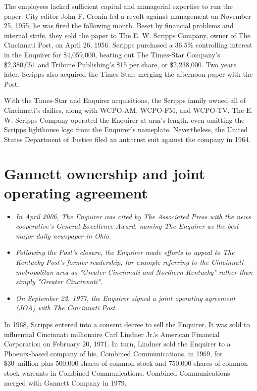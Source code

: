 The employees lacked sufficient capital and managerial expertise to run
the paper. City editor John F. Cronin led a revolt against management on
November 25, 1955; he was fired the following month. Beset by financial
problems and internal strife, they sold the paper to The E. W. Scripps
Company, owner of The Cincinnati Post, on April 26, 1956. Scripps
purchased a 36.5\% controlling interest in the Enquirer for \$4,059,000,
beating out The Times-Star Company's \$2,380,051 and Tribune
Publishing's \$15 per share, or \$2,238,000. Two years later, Scripps
also acquired the Times-Star, merging the afternoon paper with the Post.

With the Times-Star and Enquirer acquisitions, the Scripps family owned
all of Cincinnati's dailies, along with WCPO-AM, WCPO-FM, and WCPO-TV.
The E. W. Scripps Company operated the Enquirer at arm's length, even
omitting the Scripps lighthouse logo from the Enquirer's nameplate.
Nevertheless, the United States Department of Justice filed an antitrust
suit against the company in 1964.

\section{Gannett ownership and joint operating
agreement}\label{gannett-ownership-and-joint-operating-agreement}

\begin{itemize}
\item
  \emph{In April 2006, The Enquirer was cited by The Associated Press
  with the news cooperative's General Excellence Award, naming The
  Enquirer as the best major daily newspaper in Ohio.}
\item
  \emph{Following the Post's closure, the Enquirer made efforts to
  appeal to The Kentucky Post's former readership, for example referring
  to the Cincinnati metropolitan area as "Greater Cincinnati and
  Northern Kentucky" rather than simply "Greater Cincinnati".}
\item
  \emph{On September 22, 1977, the Enquirer signed a joint operating
  agreement (JOA) with The Cincinnati Post.}
\end{itemize}

In 1968, Scripps entered into a consent decree to sell the Enquirer. It
was sold to influential Cincinnati millionaire Carl Lindner Jr.'s
American Financial Corporation on February 20, 1971. In turn, Lindner
sold the Enquirer to a Phoenix-based company of his, Combined
Communications, in 1969, for \$30~million plus 500,000 shares of common
stock and 750,000 shares of common stock warrants in Combined
Communications. Combined Communications merged with Gannett Company in
1979.


